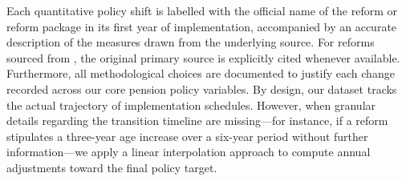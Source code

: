 \documentclass[11pt,english,a4paper, twoside, authoryear]{article}
\begin{document}
Each quantitative policy shift is labelled with the official name of the reform or reform package in its first year of implementation, accompanied by an accurate description of the measures drawn from the underlying source. For reforms sourced from \citet{romp_political_2024}, the original primary source is explicitly cited whenever available. Furthermore, all methodological choices are documented to justify each change recorded across our core pension policy variables. By design, our dataset tracks the actual trajectory of implementation schedules. However, when granular details regarding the transition timeline are missing---for instance, if a reform stipulates a three-year age increase over a six-year period without further information---we apply a linear interpolation approach to compute annual adjustments toward the final policy target.








\end{document}

